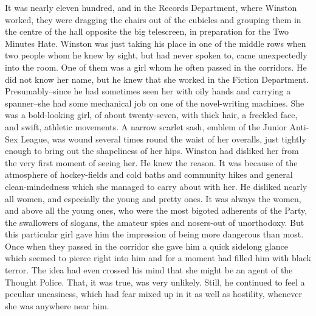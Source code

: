 \documentclass{article}
\begin{document}
It was nearly eleven hundred, and in the Records Department, where Winston
worked, they were dragging the chairs out of the cubicles and grouping them
in the centre of the hall opposite the big telescreen, in preparation for
the Two Minutes Hate. Winston was just taking his place in one of the
middle rows when two people whom he knew by sight, but had never spoken
to, came unexpectedly into the room. One of them was a girl whom he often
passed in the corridors. He did not know her name, but he knew that she
worked in the Fiction Department. Presumably--since he had sometimes seen
her with oily hands and carrying a spanner--she had some mechanical job
on one of the novel-writing machines. She was a bold-looking girl, of
about twenty-seven, with thick hair, a freckled face, and swift, athletic
movements. A narrow scarlet sash, emblem of the Junior Anti-Sex League, was
wound several times round the waist of her overalls, just tightly enough to
bring out the shapeliness of her hips. Winston had disliked her from the
very first moment of seeing her. He knew the reason. It was because of the
atmosphere of hockey-fields and cold baths and community hikes and general
clean-mindedness which she managed to carry about with her. He disliked
nearly all women, and especially the young and pretty ones. It was always
the women, and above all the young ones, who were the most bigoted
adherents of the Party, the swallowers of slogans, the amateur spies and
nosers-out of unorthodoxy. But this particular girl gave him the impression
of being more dangerous than most. Once when they passed in the corridor
she gave him a quick sidelong glance which seemed to pierce right into
him and for a moment had filled him with black terror. The idea had even
crossed his mind that she might be an agent of the Thought Police. That,
it was true, was very unlikely. Still, he continued to feel a peculiar
uneasiness, which had fear mixed up in it as well as hostility, whenever
she was anywhere near him.
\end{document}
